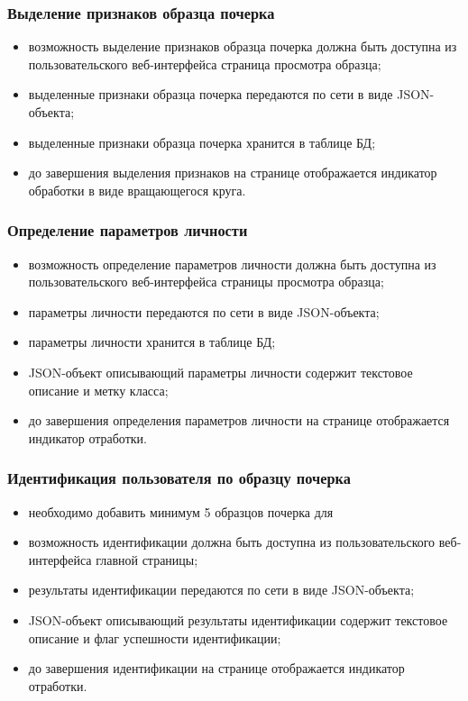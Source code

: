 \subsubsection{Выделение признаков образца почерка}
\label{sec:freq:extract_features}
\begin{itemize}
	\item возможность выделение признаков образца почерка должна быть доступна из пользовательского веб-интерфейса страница просмотра образца;
	\item выделенные признаки образца почерка передаются по сети в виде JSON-объекта;
	\item выделенные признаки образца почерка хранится в таблице БД;
	\item до завершения выделения признаков на странице отображается индикатор обработки в виде вращающегося круга.
\end{itemize}

\subsubsection{Определение параметров личности}
\label{sec:freq:psiho_analysis}
\begin{itemize}
	\item возможность определение параметров личности должна быть доступна из пользовательского веб-интерфейса страницы просмотра образца;
	\item параметры личности передаются по сети в виде JSON-объекта;
	\item параметры личности хранится в таблице БД;
	\item JSON-объект описывающий параметры личности содержит текстовое описание и метку класса;
	\item до завершения определения параметров личности на странице отображается индикатор отработки.
\end{itemize}

\subsubsection{Идентификация пользователя по образцу почерка}
\label{sec:freq:identification}
\begin{itemize}
	\item необходимо добавить минимум 5 образцов почерка для 
	\item возможность идентификации должна быть доступна из пользовательского веб-интерфейса главной страницы;
	\item результаты идентификации передаются по сети в виде JSON-объекта;
	\item JSON-объект описывающий результаты идентификации содержит текстовое описание и флаг успешности идентификации;
	\item до завершения идентификации на странице отображается индикатор отработки.
\end{itemize}

